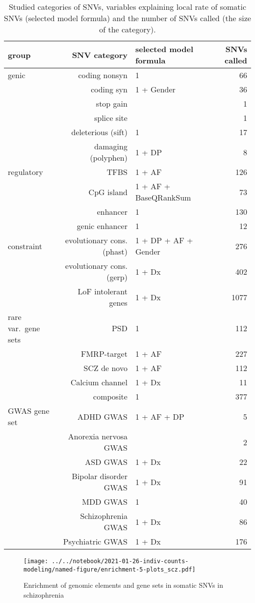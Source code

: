 \documentclass[letterpaper]{article}
\begin{document}
\begin{table}
\begin{tabular}{lrlr}
group & SNV category & selected model formula & SNVs called \\
\hline
\hline
genic & coding nonsyn & 1 & 66\\
 & coding syn & 1 + Gender & 36\\
 & stop gain &  & 1\\
 & splice site &  & 1\\
 & deleterious (sift) & 1 & 17\\
 & damaging (polyphen) & 1 + DP & 8\\
regulatory & TFBS & 1 + AF & 126\\
 & CpG island & 1 + AF + BaseQRankSum & 73\\
 & enhancer & 1 & 130\\
 & genic enhancer & 1 & 12\\
constraint & evolutionary cons. (phast) & 1 + DP + AF + Gender & 276\\
 & evolutionary cons. (gerp) & 1 + Dx & 402\\
 & LoF intolerant genes & 1 + Dx & 1077\\
rare var.~gene sets  & PSD & 1 & 112\\
 & FMRP-target & 1 + AF & 227\\
 & SCZ de novo & 1 + AF & 112\\
 & Calcium channel & 1 + Dx & 11\\
 & composite & 1 & 377\\
GWAS gene set & ADHD GWAS & 1 + AF + DP & 5\\
 & Anorexia nervosa GWAS &  & 2\\
 & ASD GWAS & 1 + Dx & 22\\
 & Bipolar disorder GWAS & 1 + Dx & 91\\
 & MDD GWAS & 1 & 40\\
 & Schizophrenia GWAS & 1 + Dx & 86\\
 & Psychiatric GWAS & 1 + Dx & 176\\
\end{tabular}
\caption{
	Studied categories of SNVs, variables explaining local rate of somatic
	SNVs (selected model formula) and the number of SNVs called (the size
	of the category).
}
\label{tab:modsel}
\end{table}

\begin{figure}
\texttt{[image: ../../notebook/2021-01-26-indiv-counts-modeling/named-figure/enrichment-5-plots\_scz.pdf]}
\caption{Enrichment of genomic elements and gene sets in somatic SNVs in schizophrenia}
\label{fig:testresults}
\end{figure}
\end{document}
